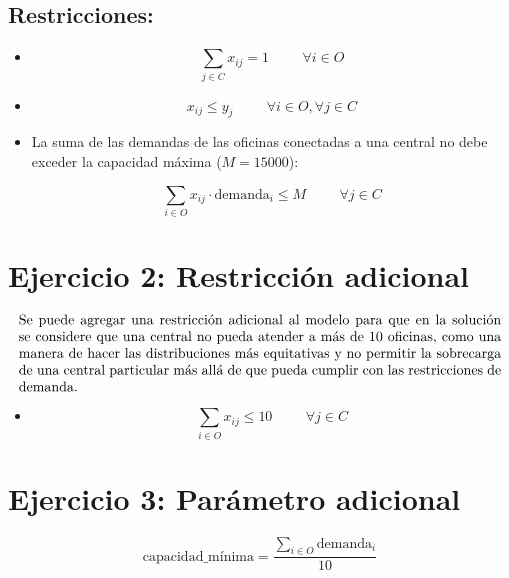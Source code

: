 \documentclass{article}
\begin{document}
\subsection*{Restricciones:}

\begin{itemize}
    \item {}
    \[
    \sum_{j \in C} x_{ij} = 1     \hspace{1cm} \forall i \in O
    \]
    
    \vspace{0.3cm}
    
    \item {}
    \[
    x_{ij} \leq y_j  \hspace{1cm}\forall i \in O, \forall j \in C
    \]
    
    \vspace{0.3cm}

    \item\parbox{\textwidth}{La suma de las demandas de las oficinas conectadas a una central no debe exceder la capacidad máxima (\(M = 15000\)):}
    \[
   \sum_{i \in O} x_{ij} \cdot \text{demanda}_i \leq M \hspace{1cm} \forall j \in C
    \]
\end{itemize}

\section*{Ejercicio 2: Restricción adicional}
\[
\parbox{\textwidth}{Se puede agregar una restricción adicional al modelo para que en la solución se considere que una central no pueda atender a más de 10 oficinas, como una manera de hacer las distribuciones más equitativas y no permitir la sobrecarga de una central particular más allá de que pueda cumplir con las restricciones de demanda.}
\]


\begin{itemize}
    \item {}
    \[
   \sum_{i \in O} x_{ij} \leq 10 \hspace{1cm}\forall j \in C
    \]
\end{itemize}

\section*{Ejercicio 3: Parámetro adicional}

\[
\text{capacidad\_mínima} = \frac{\sum_{i \in O} \text{demanda}_i}{10}
\]
\end{document}
